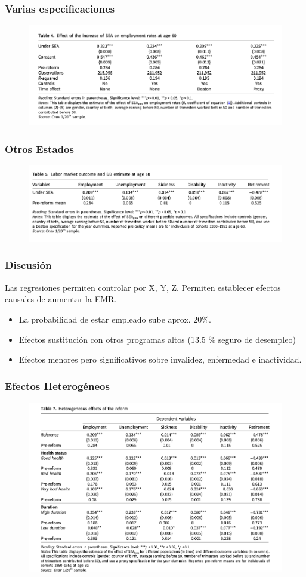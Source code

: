 \documentclass{beamer}
\begin{document}
  \frame
  {
    \frametitle{Varias especificaciones}
      \begin{figure}[htp]
        \centering
        \includegraphics[width=12cm]{imgs/rabate-tab4}
        \label{fig:fig2}
      \end{figure}
  }
  \frame
  {
    \frametitle{Otros Estados}
      \begin{figure}[htp]
        \centering
        \includegraphics[width=12cm]{imgs/rabate-tab5}
        \label{fig:fig2}
      \end{figure}
  }
  \frame
  {
    \frametitle{Discusión}
    Las regresiones permiten controlar por X, Y, Z. Permiten establecer efectos causales de aumentar la EMR.
      \begin{itemize}
      \item La probabilidad de estar empleado sube aprox. 20\%.
      \item Efectos sustitución con otros programas altos (13.5 \% seguro de desempleo)
      \item Efectos menores pero significativos sobre invalidez, enfermedad e inactividad.
      \end{itemize}
  }
  \frame
  {
    \frametitle{Efectos Heterogéneos}
        \begin{figure}[htp]
        \centering
        \includegraphics[width=12cm]{imgs/rabate-tab7}
        \label{fig:fig2}
      \end{figure}
    
  }
  
\end{document}

